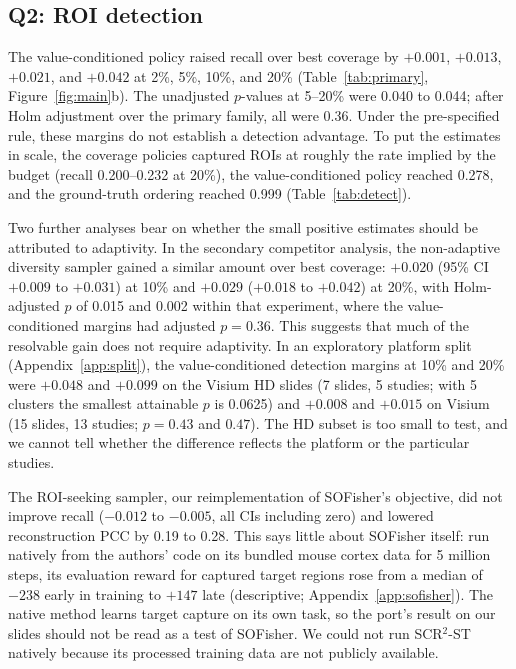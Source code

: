 \documentclass{article}
\begin{document}
\subsection{Q2: ROI detection}
The value-conditioned policy raised recall over best coverage by $+0.001$, $+0.013$, $+0.021$, and $+0.042$ at
2\%, 5\%, 10\%, and 20\% (Table~\ref{tab:primary}, Figure~\ref{fig:main}b). The unadjusted $p$-values at 5--20\%
were 0.040 to 0.044; after Holm adjustment over the primary family, all were 0.36. Under the pre-specified rule,
these margins do not establish a detection advantage. To put the estimates in scale, the coverage policies
captured ROIs at roughly the rate implied by the budget (recall 0.200--0.232 at 20\%), the value-conditioned
policy reached 0.278, and the ground-truth ordering reached 0.999 (Table~\ref{tab:detect}).

Two further analyses bear on whether the small positive estimates should be attributed to adaptivity. In the
secondary competitor analysis, the non-adaptive diversity sampler gained a similar amount over best coverage:
$+0.020$ (95\% CI $+0.009$ to $+0.031$) at 10\% and $+0.029$ ($+0.018$ to $+0.042$) at 20\%, with Holm-adjusted $p$
of 0.015 and 0.002 within that experiment, where the value-conditioned margins had adjusted $p=0.36$. This
suggests that much of the resolvable gain does not require adaptivity. In an exploratory platform split
(Appendix~\ref{app:split}), the value-conditioned detection margins at 10\% and 20\% were $+0.048$ and $+0.099$ on
the Visium HD slides (7 slides, 5 studies; with 5 clusters the smallest attainable $p$ is 0.0625) and $+0.008$
and $+0.015$ on Visium (15 slides, 13 studies; $p=0.43$ and $0.47$). The HD subset is too small to test, and we
cannot tell whether the difference reflects the platform or the particular studies.

The ROI-seeking sampler, our reimplementation of SOFisher's objective, did not improve recall ($-0.012$ to
$-0.005$, all CIs including zero) and lowered reconstruction PCC by 0.19 to 0.28. This says little about
SOFisher itself: run natively from the authors' code on its bundled mouse cortex data for 5 million steps, its
evaluation reward for captured target regions rose from a median of $-238$ early in training to $+147$ late
(descriptive; Appendix~\ref{app:sofisher}). The native method learns target capture on its own task, so the
port's result on our slides should not be read as a test of SOFisher. We could not run SCR$^2$-ST natively because its
processed training data are not publicly available.
\end{document}
